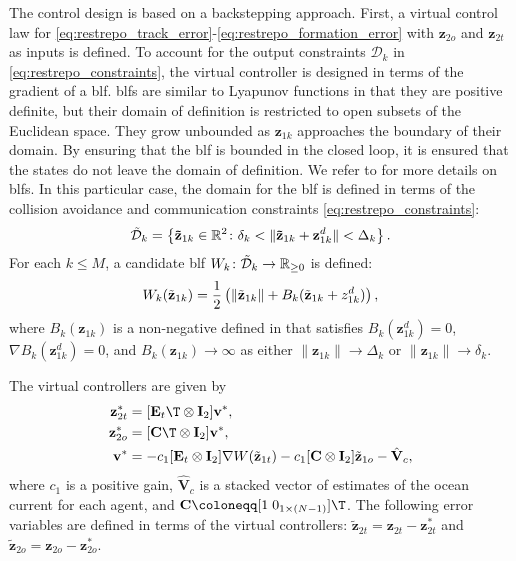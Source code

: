 The control design is based on a backstepping approach. First, a virtual control law for \eqref{eq:restrepo_track_error}-\eqref{eq:restrepo_formation_error} with $\mathbf{z}_{2o}$ and $\mathbf{z}_{2t}$ as inputs is defined. To account for the output constraints $\mathcal{D}_k$ in \eqref{eq:restrepo_constraints}, the virtual controller is designed in terms of the gradient of a \gls{blf}. \glspl{blf} are similar to Lyapunov functions in that they are positive definite, but their domain of definition is restricted to open subsets of the Euclidean space. They grow unbounded as $\mathbf{z}_{1k}$ approaches the boundary of their domain. By ensuring that the \gls{blf} is bounded in the closed loop, it is ensured that the states do not leave the domain of definition. We refer to \cite{tee_barrier_2009} for more details on \glspl{blf}. In this particular case, the domain for the \gls{blf} is defined in terms of the collision avoidance and communication constraints \eqref{eq:restrepo_constraints}:
\begin{equation}
    \mathcal{\Tilde{D}}_k = \left\{\mathbf{\Tilde{z}}_{1k} \in \mathbb  {R}^2 \colon \delta_k < \| \mathbf{\Tilde{z}}_{1k} + \mathbf{z}_{1k}^d \| < \Delta_k \right\}.
\end{equation}
For each $k\leq M$, a candidate \gls{blf} $W_k \colon \mathcal{\Tilde{D}}_k \rightarrow \mathbb{R}_{\geq 0}$ is defined:
\begin{equation}
    W_k(\Tilde{\mathbf{z}}_{1k}) = \frac{1}{2}\left(\|\tilde{\mathbf{z}}_{1k}\| + B_k(\tilde{\mathbf{z}}_{1k}+z_{1k}^d)\right),
\end{equation}
where $B_k(\mathbf{z}_{1k})$ is a non-negative defined in \cite{restrepo_tracking--formation_2022} that satisfies $B_k(\mathbf{z}_{1k}^d) = 0$, $\nabla B_k(\mathbf{z}_{1k}^d) = 0$, and $B_k(\mathbf{z}_{1k}) \rightarrow  \infty$ as either $\|\mathbf{z}_{1k}\| \rightarrow \Delta_k$ or $\|\mathbf{z}_{1k}\| \rightarrow \delta_k$.

The virtual controllers are given by
\begin{subequations}
    \begin{align}
        \mathbf{z}_{2t}^* &= [\mathbf{E}_t\T \otimes \mathbf{I}_2]\mathbf{v}^*,\\
        \mathbf{z}_{2o}^* &= [\mathbf{C}\T \otimes \mathbf{I}_2]\mathbf{v}^*,\\
        \mathbf{v}^* &= -c_1 [\mathbf{E}_t \otimes \mathbf{I}_2]\nabla W(\tilde{\mathbf{z}}_{1t}) - c_1 [\mathbf{C} \otimes \mathbf{I}_2]\tilde{\mathbf{z}}_{1o} - \hat{\mathbf{V}}_c,
    \end{align}
\end{subequations}
where $c_1$ is a positive gain, $\hat{\mathbf{V}}_c$ is a stacked vector of estimates of the ocean current for each agent, and $\mathbf{C} \coloneqq [1\; 0_{1\times(N-1)}]\T$. The following error variables are defined in terms of the virtual controllers: $\tilde{\mathbf{z}}_{2t} = \mathbf{z}_{2t} - \mathbf{z}_{2t}^*$ and $\tilde{\mathbf{z}}_{2o} = \mathbf{z}_{2o} - \mathbf{z}_{2o}^*$.

